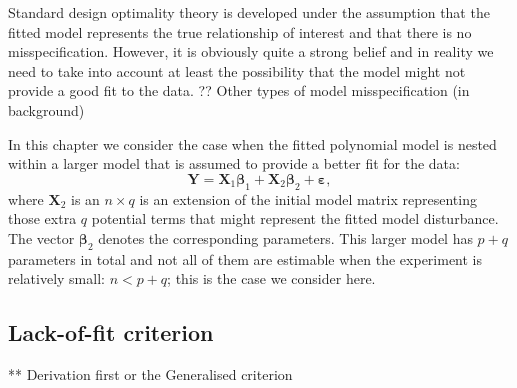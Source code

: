 Standard design optimality theory is developed under the assumption that the fitted model represents the true relationship of interest and that there is no misspecification. However, it is obviously quite a strong belief and in reality we need to take into account at least the possibility that the model might not provide a good fit to the data. 
?? Other types of model misspecification (in background)

In this chapter we consider the case when the fitted polynomial model is nested within a larger model that is assumed to provide a better fit for the data:
\begin{equation}
\label{eq::full_model}
\bm{Y}=\bm{X}_1\bm{\beta}_1+\bm{X}_2\bm{\beta}_2+\bm{\varepsilon},
\end{equation}
where $\bm{X}_2$ is an $n\times q$ is an extension of the initial model matrix representing those extra $q$ potential terms that might represent the fitted model disturbance. The vector $\bm{\beta}_2$ denotes the corresponding parameters. This larger model has $p+q$ parameters in total and not all of them are estimable when the experiment is relatively small: $n<p+q$; this is the case we consider here.
\subsection{Lack-of-fit criterion}

 ** Derivation first or the Generalised criterion

